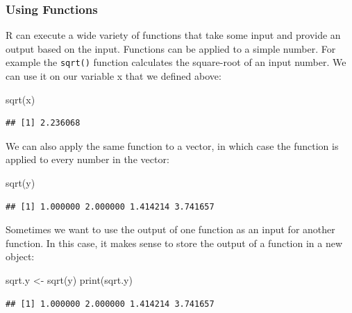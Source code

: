 \documentclass[
]{book}
\newenvironment{Shaded}{\begin{snugshade}}{\end{snugshade}}
\newcommand{\FunctionTok}[1]{\textcolor[rgb]{0.00,0.00,0.00}{#1}}
\newcommand{\NormalTok}[1]{#1}
\newcommand{\OtherTok}[1]{\textcolor[rgb]{0.56,0.35,0.01}{#1}}
\begin{document}
\hypertarget{using-functions}{%
\subsubsection*{Using Functions}\label{using-functions}}

R can execute a wide variety of functions that take some input and provide an output based on the input. Functions can be applied to a simple number. For example the \texttt{sqrt()} function calculates the square-root of an input number. We can use it on our variable x that we defined above:

\begin{Shaded}
\begin{Highlighting}[]
\FunctionTok{sqrt}\NormalTok{(x)}
\end{Highlighting}
\end{Shaded}

\begin{verbatim}
## [1] 2.236068
\end{verbatim}

We can also apply the same function to a vector, in which case the function is applied to every number in the vector:

\begin{Shaded}
\begin{Highlighting}[]
\FunctionTok{sqrt}\NormalTok{(y)}
\end{Highlighting}
\end{Shaded}

\begin{verbatim}
## [1] 1.000000 2.000000 1.414214 3.741657
\end{verbatim}

Sometimes we want to use the output of one function as an input for another function. In this case, it makes sense to store the output of a function in a new object:

\begin{Shaded}
\begin{Highlighting}[]
\NormalTok{sqrt.y }\OtherTok{\textless{}{-}} \FunctionTok{sqrt}\NormalTok{(y)}
\FunctionTok{print}\NormalTok{(sqrt.y)}
\end{Highlighting}
\end{Shaded}

\begin{verbatim}
## [1] 1.000000 2.000000 1.414214 3.741657
\end{verbatim}
\end{document}
